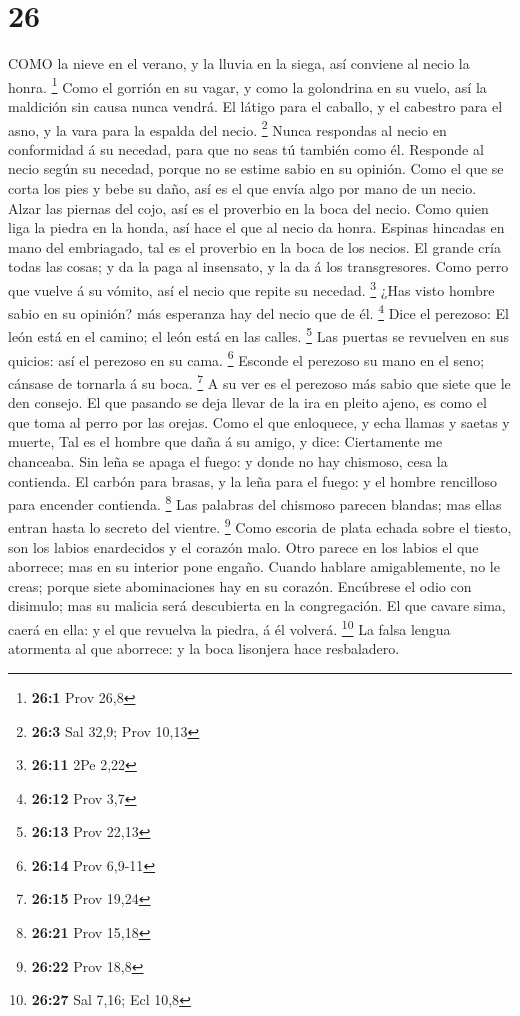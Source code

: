 \hypertarget{section-25}{%
\section{26}\label{section-25}}

 COMO la nieve en el verano, y la lluvia en la siega, así
conviene al necio la honra. \footnote{\textbf{26:1} Prov 26,8}
 Como el gorrión en su vagar, y como la golondrina en su
vuelo, así la maldición sin causa nunca vendrá.  El látigo
para el caballo, y el cabestro para el asno, y la vara para la espalda
del necio. \footnote{\textbf{26:3} Sal 32,9; Prov 10,13} 
Nunca respondas al necio en conformidad á su necedad, para que no seas
tú también como él.  Responde al necio según su necedad,
porque no se estime sabio en su opinión.  Como el que se
corta los pies y bebe su daño, así es el que envía algo por mano de un
necio.  Alzar las piernas del cojo, así es el proverbio en
la boca del necio.  Como quien liga la piedra en la honda,
así hace el que al necio da honra.  Espinas hincadas en mano
del embriagado, tal es el proverbio en la boca de los necios.
 El grande cría todas las cosas; y da la paga al insensato,
y la da á los transgresores.  Como perro que vuelve á su
vómito, así el necio que repite su necedad. \footnote{\textbf{26:11} 2Pe
  2,22}  ¿Has visto hombre sabio en su opinión? más
esperanza hay del necio que de él. \footnote{\textbf{26:12} Prov 3,7}
 Dice el perezoso: El león está en el camino; el león está
en las calles. \footnote{\textbf{26:13} Prov 22,13}  Las
puertas se revuelven en sus quicios: así el perezoso en su cama.
\footnote{\textbf{26:14} Prov 6,9-11}  Esconde el perezoso
su mano en el seno; cánsase de tornarla á su boca. \footnote{\textbf{26:15}
  Prov 19,24}  A su ver es el perezoso más sabio que siete
que le den consejo.  El que pasando se deja llevar de la
ira en pleito ajeno, es como el que toma al perro por las orejas.
 Como el que enloquece, y echa llamas y saetas y muerte,
 Tal es el hombre que daña á su amigo, y dice: Ciertamente
me chanceaba.  Sin leña se apaga el fuego: y donde no hay
chismoso, cesa la contienda.  El carbón para brasas, y la
leña para el fuego: y el hombre rencilloso para encender contienda.
\footnote{\textbf{26:21} Prov 15,18}  Las palabras del
chismoso parecen blandas; mas ellas entran hasta lo secreto del vientre.
\footnote{\textbf{26:22} Prov 18,8}  Como escoria de plata
echada sobre el tiesto, son los labios enardecidos y el corazón malo.
 Otro parece en los labios el que aborrece; mas en su
interior pone engaño.  Cuando hablare amigablemente, no le
creas; porque siete abominaciones hay en su corazón. 
Encúbrese el odio con disimulo; mas su malicia será descubierta en la
congregación.  El que cavare sima, caerá en ella: y el que
revuelva la piedra, á él volverá. \footnote{\textbf{26:27} Sal 7,16; Ecl
  10,8}  La falsa lengua atormenta al que aborrece: y la
boca lisonjera hace resbaladero.

